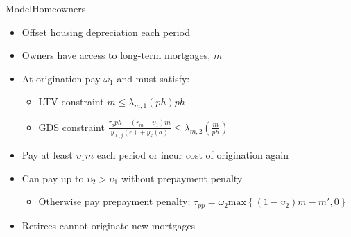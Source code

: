 \documentclass[11pt,aspectratio=169]{beamer}
\begin{document}
\begin{frame}{Model}{Homeowners}

\begin{itemize}
    \item Offset housing depreciation each period
    \item Owners have access to long-term mortgages, $m$ \citep{rs-2023}
    \item At origination pay $\omega_{1}$ and must satisfy:
    \begin{itemize}
        \item LTV constraint $m \leq \lambda_{m,1}(ph) p h$
        \item GDS constraint $\frac{\tau_{p}ph+(r_{m}+\upsilon_{1})m}{y_{\ell,j}(e)+y_{k}(a)} \leq \lambda_{m,2}\left(\frac{m}{ph}\right)$
    \end{itemize}
    \item Pay at least $\upsilon_{1}m$ each period or incur cost of origination again
    \item Can pay up to $\upsilon_{2}>\upsilon_{1}$ without prepayment penalty
    \begin{itemize}
        \item Otherwise pay prepayment penalty: $\tau_{pp}=\omega_{2}\mbox{max}\left\{(1-\upsilon_{2})m-m',0\right\}$
    \end{itemize}
    \item Retirees cannot originate new mortgages
\end{itemize}

\end{frame}
\end{document}
